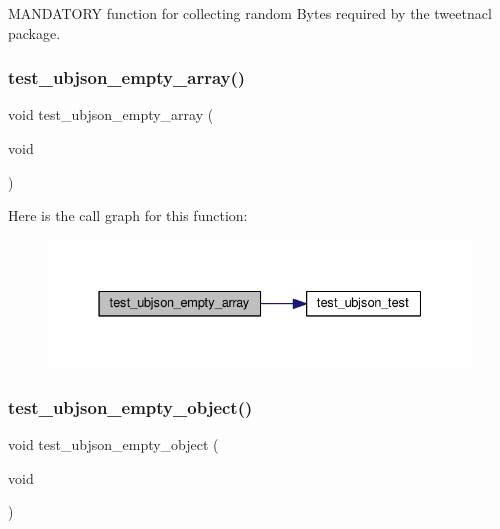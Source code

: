 M\+A\+N\+D\+A\+T\+O\+RY function for collecting random Bytes required by the tweetnacl package. 

\mbox{\label{group__unittests_ga9da1a8e30a96a87edc4a759e4742b998}} 
\subsubsection{\texorpdfstring{test\+\_\+ubjson\+\_\+empty\+\_\+array()}{test\_ubjson\_empty\_array()}}
{\footnotesize\ttfamily void test\+\_\+ubjson\+\_\+empty\+\_\+array (\begin{DoxyParamCaption}\item[{void}]{ }\end{DoxyParamCaption})}

Here is the call graph for this function\+:
\nopagebreak
\begin{figure}[H]
\begin{center}
\leavevmode
\includegraphics[width=331pt]{group__unittests_ga9da1a8e30a96a87edc4a759e4742b998_cgraph}
\end{center}
\end{figure}
\mbox{\label{group__unittests_ga770a7e979bea402d2c2b99bded276d67}} 
\subsubsection{\texorpdfstring{test\+\_\+ubjson\+\_\+empty\+\_\+object()}{test\_ubjson\_empty\_object()}}
{\footnotesize\ttfamily void test\+\_\+ubjson\+\_\+empty\+\_\+object (\begin{DoxyParamCaption}\item[{void}]{ }\end{DoxyParamCaption})}

